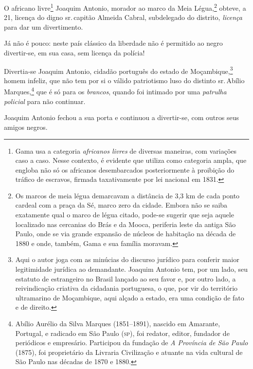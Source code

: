 O africano livre\footnote{Gama usa a categoria \emph{africanos livres}
  de diversas maneiras, com variações caso a caso. Nesse contexto, é
  evidente que utiliza como categoria ampla, que engloba não só os
  africanos desembarcados posteriormente à proibição do tráfico de
  escravos, firmada taxativamente por lei nacional em 1831.}
   Joaquim
Antonio, morador ao marco da Meia Légua,\footnote{Os marcos de meia
  légua demarcavam a distância de 3,3 km de cada ponto cardeal com a
  praça da Sé, marco zero da cidade. Embora não se saiba exatamente qual
  o marco de légua citado, pode-se sugerir que seja aquele localizado
  nas cercanias do Brás e da Mooca, periferia leste da antiga São Paulo,
  onde se via grande expansão de núcleos de habitação na década de 1880
  e onde, também, Gama e sua família moravam.} obteve, a 21, licença do
digno sr.\,capitão Almeida Cabral, subdelegado do distrito,
\emph{licença} para dar um divertimento.

Já não é pouco: neste país clássico da liberdade não é permitido ao
negro divertir-se, em sua casa, sem licença da polícia!

Divertia-se Joaquim Antonio, cidadão português do estado de
Moçambique,\footnote{Aqui o autor joga com as minúcias do discurso
  jurídico para conferir maior legitimidade jurídica ao demandante.
  Joaquim Antonio tem, por um lado, seu estatuto de estrangeiro no
  Brasil lançado ao seu favor e, por outro lado, a reivindicação
  criativa da cidadania portuguesa, o que, por vir do território
  ultramarino de Moçambique, aqui alçado a estado, era uma condição de
  fato e de direito.} homem infeliz, que não tem por si o válido
patriotismo luso do distinto sr.\,Abílio Marques,\footnote{Abílio
  Aurélio da Silva Marques (1851--1891), nascido em Amarante, Portugal, e
  radicado em São Paulo (\textsc{sp}), foi redator, editor, fundador de
  periódicos e empresário. Participou da fundação de \emph{A Província
  de São Paulo} (1875), foi proprietário da Livraria Civilização e
  atuante na vida cultural de São Paulo nas décadas de 1870 e 1880.}
que é só para os
\emph{brancos}, quando foi intimado por uma \emph{patrulha policial}
para não continuar.

Joaquim Antonio fechou a sua porta e continuou a divertir-se, com outros
seus amigos negros.

